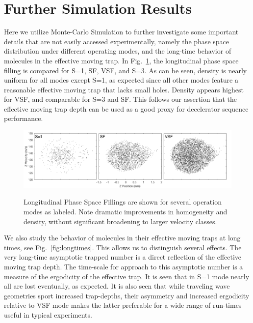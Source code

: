 \documentclass[%
 reprint,
 amsmath,amssymb,
 aps,
prl,
]{revtex4-1}
\begin{document}
\section{Further Simulation Results}
Here we utilize Monte-Carlo Simulation to further investigate some important details that are not easily accessed experimentally, namely the phase space distribution under different operating modes, and the long-time behavior of molecules in the effective moving trap.
In Fig.~\ref{fig:phasespace}, the longitudinal phase space filling is compared for S=1, SF, VSF, and S=3. 
As can be seen, density is nearly uniform for all modes except S=1, as expected since all other modes feature a reasonable effective moving trap that lacks small holes. 
Density appears highest for VSF, and comparable for S=3 and SF. 
This follows our assertion that the effective moving trap depth can be used as a good proxy for decelerator sequence performance. 

\begin{figure}[t]
\includegraphics[width=\linewidth]{S=1_SF_VSF.png}
\label{fig:phasespace}
\caption{
Longitudinal Phase Space Fillings are shown for several operation modes as labeled. Note dramatic improvements in homogeneity and density, without significant broadening to larger velocity classes.
}
\end{figure}

We also study the behavior of molecules in their effective moving traps at long times, see Fig.~\ref{fig:longtimes}.
This allows us to distinguish several effects. 
The very long-time asymptotic trapped number is a direct reflection of the effective moving trap depth.
The time-scale for approach to this asymptotic number is a measure of the ergodicity of the effective trap.
It is seen that in S=1 mode nearly all are lost eventually, as expected.
It is also seen that while traveling wave geometries sport increased trap-depths, their asymmetry and increased ergodicity relative to VSF mode makes the latter preferable for a wide range of run-times useful in typical experiments.
\end{document}
